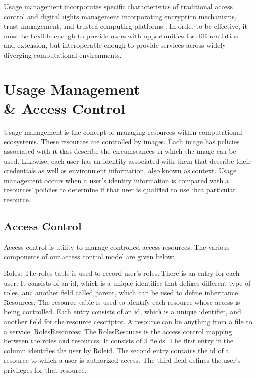\documentclass{acm_proc_article-sp}
\begin{document}
Usage management incorporates specific characteristics of traditional access control and digital rights management incorporating encryption mechanisms, trust management, and trusted computing platforms \cite{Jamkhedkar:2010:IUM:1866870.1866885}.  In order to be effective, it must be flexible enough to provide users with opportunities for differentiation and extension, but interoperable enough to provide services across widely diverging computational environments.

\section{Usage Management \\ \& Access Control}
Usage management is the concept of managing resources within computational ecosystems.  These resources are controlled by images.  Each image has policies associated with it that describe the circumstances in which the image can be used. Likewise, each user has an identity associated with them that describe their credentials as well as environment information, also known as context. Usage management occurs when a user's identity information is compared with a resources' policies to determine if that user is qualified to use that particular resource.

\subsection{Access Control}
Access control is utility to manage controlled access resources.  The various components of our access control model are given below:

Roles: The roles table is used to record user's roles. There is an entry for each user. It consists of an id, which is a unique identifier that defines different type of roles, and another field called parent, which can be used to define inheritance. 
Resources: The resource table is used to identify each resource whose access is being controlled. Each entry consists of an id, which is a unique identifier, and another field for the resource descriptor. A resource can be anything from a file to a service.
RolesResources: The RolesResouces is the access control mapping between the roles and resources. It consists of 3 fields. The first entry in the column identifies the user by Roleid. The second entry contains the id of a resource to which a user is authorized access. The third field defines the user's privileges for that resource.
\end{document}
